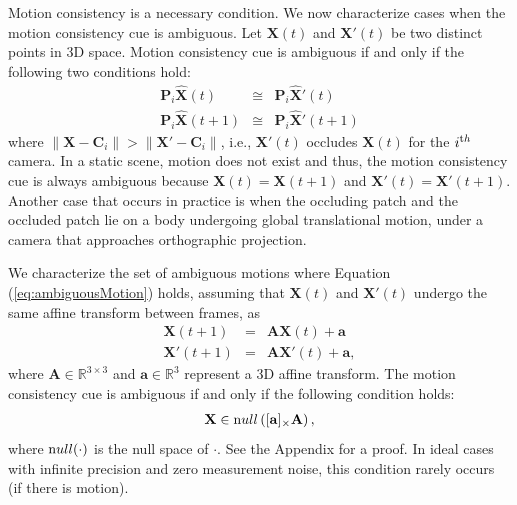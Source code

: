 Motion consistency is a necessary condition. We now characterize cases when the motion consistency cue is ambiguous. Let $\mathbf{X}(t)$ and $\mathbf{X}'(t)$ be two distinct points in 3D space. Motion consistency cue is ambiguous if and only if the following two conditions hold:
\begin{eqnarray}
\mathbf{P}_i {\widehat{\mathbf{X}}}(t)&\cong&\mathbf{P}_i {\widehat{\mathbf{X}}'}(t)\label{Eq:projection1}  \nonumber \\
\mathbf{P}_i {\widehat{\mathbf{X}}}(t+1)&\cong&\mathbf{P}_i {\widehat{\mathbf{X}}'}(t+1)\label{Eq:projection2}
\label{eq:ambiguousMotion}
\end{eqnarray}
where $\| \mathbf{X} - \mathbf{C}_i \| > \| \mathbf{X'} - \mathbf{C}_i \|$, i.e., $\mathbf{X}'(t)$ occludes $\mathbf{X}(t)$ for the $i^{\textrm th}$ camera.
In a static scene, motion does not exist and thus, the motion consistency cue is always ambiguous because $\mathbf{X}(t) = \mathbf{X}(t+1)$ and $\mathbf{X'}(t) = \mathbf{X'}(t+1)$. Another case that occurs in practice is when the occluding patch and the occluded patch lie on a body undergoing global translational motion, under a camera that approaches orthographic projection. 

We characterize the set of ambiguous motions where Equation (\ref{eq:ambiguousMotion}) holds, assuming that $\mathbf{X}(t)$ and $\mathbf{X}'(t)$ undergo the same affine transform between frames, as 
\begin{eqnarray}
\mathbf{X}(t+1)&=&\mathbf{A} \mathbf{X}(t) +  \mathbf{a} \label{Eq:transform1}  \nonumber \\
\mathbf{X'}(t+1)&=&\mathbf{A} \mathbf{X'}(t) + \mathbf{a} \label{Eq:transform2}, 
\end{eqnarray}
where $\mathbf{A} \in \mathds{R}^{3 \times 3}$ and  $\mathbf{a} \in \mathds{R}^{3}$ represent a 3D affine transform. The motion consistency cue is ambiguous if and only if the following condition holds:
\begin{eqnarray}
\mathbf{X} \in {\textrm null}\left( [\mathbf{a}]_{\times} \mathbf{A} \right), \label{Eq:nullspace}  
\end{eqnarray}
where ${\textrm null}(\cdot)$ is the null space of $\cdot$. See the Appendix for a proof. In ideal cases with infinite precision and zero measurement noise, this condition rarely occurs (if there is motion).

